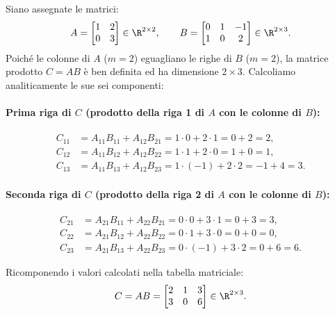 \begin{example}
Siano assegnate le matrici:
\begin{equation}
    A = \begin{bmatrix} 1 & 2 \\ 0 & 3 \end{bmatrix} \in \R^{2 \times 2}, \qquad B = \begin{bmatrix} 0 & 1 & -1 \\ 1 & 0 & 2 \end{bmatrix} \in \R^{2 \times 3}.
\end{equation}
Poich\'e le colonne di $A$ ($m = 2$) eguagliano le righe di $B$ ($m = 2$), la matrice prodotto $C = AB$ \`e ben definita ed ha dimensione $2 \times 3$. Calcoliamo analiticamente le sue sei componenti:

\paragraph{Prima riga di $C$ (prodotto della riga 1 di $A$ con le colonne di $B$):}
\begin{align}
    C_{11} &= A_{11}B_{11} + A_{12}B_{21} = 1 \cdot 0 + 2 \cdot 1 = 0 + 2 = 2, \\
    C_{12} &= A_{11}B_{12} + A_{12}B_{22} = 1 \cdot 1 + 2 \cdot 0 = 1 + 0 = 1, \\
    C_{13} &= A_{11}B_{13} + A_{12}B_{23} = 1 \cdot (-1) + 2 \cdot 2 = -1 + 4 = 3.
\end{align}

\paragraph{Seconda riga di $C$ (prodotto della riga 2 di $A$ con le colonne di $B$):}
\begin{align}
    C_{21} &= A_{21}B_{11} + A_{22}B_{21} = 0 \cdot 0 + 3 \cdot 1 = 0 + 3 = 3, \\
    C_{22} &= A_{21}B_{12} + A_{22}B_{22} = 0 \cdot 1 + 3 \cdot 0 = 0 + 0 = 0, \\
    C_{23} &= A_{21}B_{13} + A_{22}B_{23} = 0 \cdot (-1) + 3 \cdot 2 = 0 + 6 = 6.
\end{align}

Ricomponendo i valori calcolati nella tabella matriciale:
\begin{equation}
    C = AB = \begin{bmatrix} 2 & 1 & 3 \\ 3 & 0 & 6 \end{bmatrix} \in \R^{2 \times 3}.
\end{equation}
\end{example}


